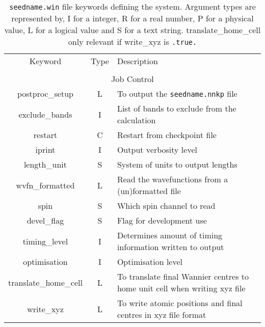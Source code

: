 \begin{table}
\begin{center}
\begin{tabular}{|c|c|p{6cm}|}
\hline
Keyword & Type & Description \\
        &      &             \\
\hline\hline
\multicolumn{3}{|c|}{Job Control} \\
\hline
{\sc postproc\_setup }   & L & To output the {\tt seedname.nnkp} file \\
{\sc exclude\_bands }   & I & List of bands to exclude from the calculation \\
{\sc restart }   & C & Restart from checkpoint file \\
{\sc iprint }   & I & Output verbosity level \\
{\sc length\_unit }   & S & System of units to output lengths \\
{\sc wvfn\_formatted }   & L & Read the wavefunctions from a  (un)formatted file  \\
{\sc spin }   & S & Which spin channel to read \\
{\sc devel\_flag }   & S & Flag for development use \\
{\sc timing\_level } & I & Determines amount of timing information
written to output \\
{\sc optimisation } & I & Optimisation level \\ 
{\sc translate\_home\_cell } & L & To translate final Wannier centres
to home unit cell when writing xyz file\\
{\sc write\_xyz }  & L & To write atomic positions and final centres in xyz file format \\
\hline
\end{tabular}
\caption[win file keywords.]
{{\tt seedname.win} file keywords defining the system.  Argument types
are represented by, I for a integer, R for a real number, P for a
physical value, L for a logical value and S for a text string. {\sc
  translate\_home\_cell } only relevant if {\sc write\_xyz} is
\texttt{.true.}}
\label{parameter_keywords2}
\end{center}
\end{table}





